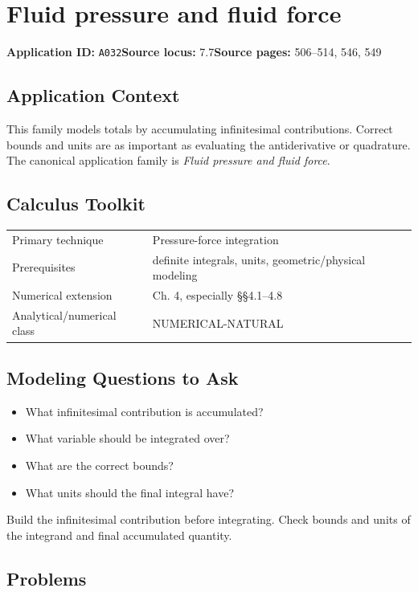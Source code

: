 \documentclass[11pt]{book}
\newcommand{\pid}[1]{\texttt{#1}}
\begin{document}
\chapter{Fluid pressure and fluid force}\label{app:A032}
\textbf{Application ID:} \pid{A032}\quad \textbf{Source locus:} 7.7\quad \textbf{Source pages:} 506–514, 546, 549
\section*{Application Context}
This family models totals by accumulating infinitesimal contributions. Correct bounds and units are as important as evaluating the antiderivative or quadrature. The canonical application family is \emph{Fluid pressure and fluid force}.
\section*{Calculus Toolkit}
\begin{tabularx}{\textwidth}{@{}lX@{}}\toprule
Primary technique & Pressure-force integration \\
Prerequisites & definite integrals, units, geometric/physical modeling \\
Numerical extension & Ch. 4, especially §§4.1–4.8 \\
Analytical/numerical class & NUMERICAL-NATURAL \\
\bottomrule\end{tabularx}
\section*{Modeling Questions to Ask}\begin{itemize}
\item What infinitesimal contribution is accumulated?
\item What variable should be integrated over?
\item What are the correct bounds?
\item What units should the final integral have?
\end{itemize}
\begin{errorbox}Build the infinitesimal contribution before integrating. Check bounds and units of the integrand and final accumulated quantity.\end{errorbox}
\section*{Problems}
\end{document}
